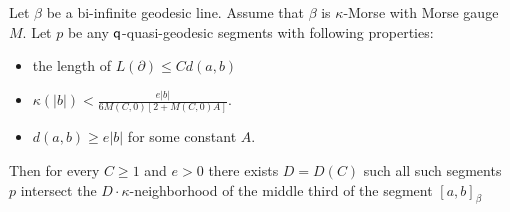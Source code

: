 \documentclass[10pt,a4paper]{amsart}
\newcommand{\p}{\partial}
\newcommand{\qq}{{\sf q}}
\begin{document}
\begin{proposition}
Let $\beta$ be a bi-infinite geodesic line. Assume that  $\beta$ is $\kappa$-Morse with Morse gauge $M$. Let $p$ be any $\qq$-quasi-geodesic segments with following properties:
\begin{itemize}
\item  the length of $L(\p)\leq Cd(a,b)$
\item ${\kappa(|b|)< \frac{e|b|}{6M(C,0)[2+M(C,0)A]}}$.
\item $d(a,b)\geq e|b|$ for some constant $A$.
\end{itemize}
Then for every $C\geq 1$ and $e > 0$ there exists $D=D(C)$ such all such segments $p$ intersect the $D\cdot\kappa$-neighborhood of the middle third of the segment $[a, b]_\beta$
\end{proposition}
\end{document}
